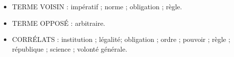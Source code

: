 \begin{itemize}[leftmargin=1cm, label=, itemsep=1pt]
\item {\footnotesize TERME VOISIN} : impératif ; norme ; obligation ; règle.
\item {\footnotesize TERME OPPOSÉ} : arbitraire.
\item {\footnotesize CORRÉLATS} : institution ; légalité; obligation ; ordre ; pouvoir ; règle ; république ; science ; volonté générale.
\end{itemize}

